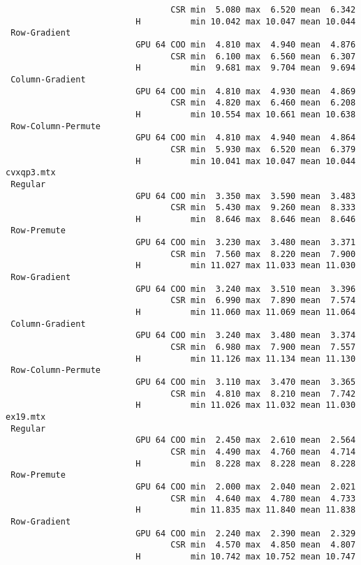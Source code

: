 {\begin{verbatim}
                                 CSR min  5.080 max  6.520 mean  6.342
                          H          min 10.042 max 10.047 mean 10.044
 Row-Gradient
                          GPU 64 COO min  4.810 max  4.940 mean  4.876
                                 CSR min  6.100 max  6.560 mean  6.307
                          H          min  9.681 max  9.704 mean  9.694
 Column-Gradient
                          GPU 64 COO min  4.810 max  4.930 mean  4.869
                                 CSR min  4.820 max  6.460 mean  6.208
                          H          min 10.554 max 10.661 mean 10.638
 Row-Column-Permute
                          GPU 64 COO min  4.810 max  4.940 mean  4.864
                                 CSR min  5.930 max  6.520 mean  6.379
                          H          min 10.041 max 10.047 mean 10.044
cvxqp3.mtx
 Regular
                          GPU 64 COO min  3.350 max  3.590 mean  3.483
                                 CSR min  5.430 max  9.260 mean  8.333
                          H          min  8.646 max  8.646 mean  8.646
 Row-Premute
                          GPU 64 COO min  3.230 max  3.480 mean  3.371
                                 CSR min  7.560 max  8.220 mean  7.900
                          H          min 11.027 max 11.033 mean 11.030
 Row-Gradient
                          GPU 64 COO min  3.240 max  3.510 mean  3.396
                                 CSR min  6.990 max  7.890 mean  7.574
                          H          min 11.060 max 11.069 mean 11.064
 Column-Gradient
                          GPU 64 COO min  3.240 max  3.480 mean  3.374
                                 CSR min  6.980 max  7.900 mean  7.557
                          H          min 11.126 max 11.134 mean 11.130
 Row-Column-Permute
                          GPU 64 COO min  3.110 max  3.470 mean  3.365
                                 CSR min  4.810 max  8.210 mean  7.742
                          H          min 11.026 max 11.032 mean 11.030
ex19.mtx
 Regular
                          GPU 64 COO min  2.450 max  2.610 mean  2.564
                                 CSR min  4.490 max  4.760 mean  4.714
                          H          min  8.228 max  8.228 mean  8.228
 Row-Premute
                          GPU 64 COO min  2.000 max  2.040 mean  2.021
                                 CSR min  4.640 max  4.780 mean  4.733
                          H          min 11.835 max 11.840 mean 11.838
 Row-Gradient
                          GPU 64 COO min  2.240 max  2.390 mean  2.329
                                 CSR min  4.570 max  4.850 mean  4.807
                          H          min 10.742 max 10.752 mean 10.747

\end{verbatim}}
